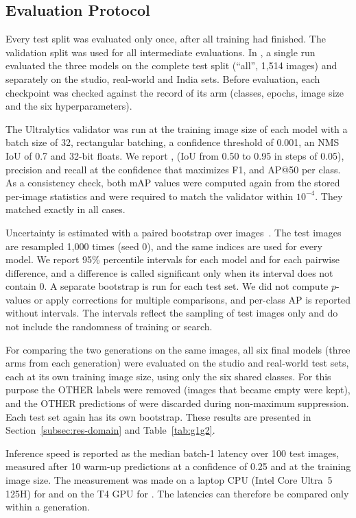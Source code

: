 \subsection{Evaluation Protocol}
\label{subsec:eval}

Every test split was evaluated only once, after all training had finished. The validation split was used for all intermediate evaluations. In \gentwo, a single run evaluated the three models on the complete test split (``all'', 1,514 images) and separately on the studio, real-world and India sets. Before evaluation, each checkpoint was checked against the record of its arm (classes, epochs, image size and the six hyperparameters).

The Ultralytics validator was run at the training image size of each model with a batch size of 32, rectangular batching, a confidence threshold of 0.001, an NMS IoU of 0.7 and 32-bit floats. We report \mapfifty, \mapfiftyninetyfive (IoU from 0.50 to 0.95 in steps of 0.05), precision and recall at the confidence that maximizes F1, and AP@50 per class. As a consistency check, both mAP values were computed again from the stored per-image statistics and were required to match the validator within $10^{-4}$. They matched exactly in all cases.

Uncertainty is estimated with a paired bootstrap over images~\cite{efron1993introduction}. The test images are resampled 1,000 times (seed 0), and the same indices are used for every model. We report 95\% percentile intervals for each model and for each pairwise difference, and a difference is called significant only when its interval does not contain 0. A separate bootstrap is run for each \gentwo test set. We did not compute $p$-values or apply corrections for multiple comparisons, and per-class AP is reported without intervals. The intervals reflect the sampling of test images only and do not include the randomness of training or search.

For comparing the two generations on the same images, all six final models (three arms from each generation) were evaluated on the studio and real-world test sets, each at its own training image size, using only the six shared classes. For this purpose the OTHER labels were removed (images that became empty were kept), and the OTHER predictions of \gentwo were discarded during non-maximum suppression. Each test set again has its own bootstrap. These results are presented in Section~\ref{subsec:res-domain} and Table~\ref{tab:g1g2}.

Inference speed is reported as the median batch-1 latency over 100 test images, measured after 10 warm-up predictions at a confidence of 0.25 and at the training image size. The measurement was made on a laptop CPU (Intel Core Ultra~5 125H) for \genone and on the T4 GPU for \gentwo. The latencies can therefore be compared only within a generation.
